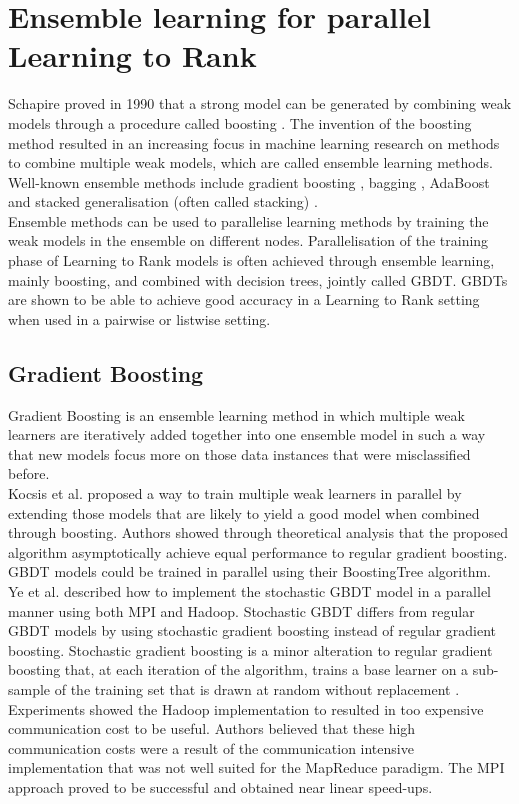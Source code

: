 \section{Ensemble learning for parallel Learning to Rank}
Schapire proved in 1990 that a strong model can be generated by combining weak models through a procedure called boosting \cite{Schapire1990}. The invention of the boosting method resulted in an increasing focus in machine learning research on methods to combine multiple weak models, which are called ensemble learning methods. Well-known ensemble methods include gradient boosting \cite{Friedman2001}, bagging \cite{Breiman1996}, AdaBoost \cite{Freund1997} and stacked generalisation (often called stacking) \cite{Wolpert1992}.\\

Ensemble methods can be used to parallelise learning methods by training the weak models in the ensemble on different nodes. Parallelisation of the training phase of Learning to Rank models is often achieved through ensemble learning, mainly boosting, and combined with decision trees, jointly called \acf{GBDT}. \ac{GBDT}s are shown to be able to achieve good accuracy in a Learning to Rank setting when used in a pairwise \cite{Zheng2007} or listwise \cite{Chen2008} setting.

\subsection{Gradient Boosting}
Gradient Boosting \cite{Friedman2001} is an ensemble learning method in which multiple weak learners are iteratively added together into one ensemble model in such a way that new models focus more on those data instances that were misclassified before.\\

Kocsis et al. \cite{Kocsis2013} proposed a way to train multiple weak learners in parallel by extending those models that are likely to yield a good model when combined through boosting. Authors showed through theoretical analysis that the proposed algorithm asymptotically achieve equal performance to regular gradient boosting. \ac{GBDT} models could be trained in parallel using their BoostingTree algorithm.\\

Ye et al. \cite{Ye2009} described how to implement the stochastic \ac{GBDT} model in a parallel manner using both MPI and Hadoop. Stochastic \ac{GBDT} differs from regular \ac{GBDT} models by using stochastic gradient boosting instead of regular gradient boosting. Stochastic gradient boosting is a minor alteration to regular gradient boosting that, at each iteration of the algorithm, trains a base learner on a sub-sample of the training set that is drawn at random without replacement \cite{Friedman2002}. Experiments showed the Hadoop implementation to resulted in too expensive communication cost to be useful. Authors believed that these high communication costs were a result of the communication intensive implementation that was not well suited for the MapReduce paradigm. The MPI approach proved to be successful and obtained near linear speed-ups.\\

